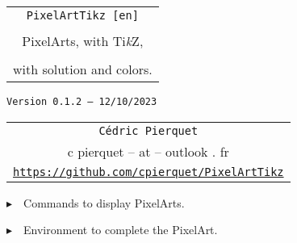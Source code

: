 \documentclass{article}
\def\TPversion{0.1.2}
\def\TPdate{12/10/2023}
\begin{document}
\pagestyle{fancy}

\thispagestyle{empty}

\vspace{2cm}

\begin{center}
	\begin{minipage}{0.75\linewidth}
	\begin{tcolorbox}[colframe=yellow,colback=yellow!15]
		\begin{center}
			\begin{tabular}{c}
				{\Huge \texttt{PixelArtTikz [en]}}\\
				\\
				{\LARGE PixelArts, with Ti\textit{k}Z}, \\
				\\
				{\LARGE with solution and colors.} \\
			\end{tabular}
			
			\medskip
			
			{\small \texttt{Version \TPversion{} -- \TPdate}}
		\end{center}
	\end{tcolorbox}
\end{minipage}
\end{center}

\vspace{0.5cm}

\begin{center}
	\begin{tabular}{c}
	\texttt{Cédric Pierquet}\\
	{\ttfamily c pierquet -- at -- outlook . fr}\\
	\texttt{\url{https://github.com/cpierquet/PixelArtTikz}}
\end{tabular}
\end{center}

\vspace{0.25cm}

{$\blacktriangleright$~~Commands to display PixelArts.}

\smallskip

{$\blacktriangleright$~~Environment to complete the PixelArt.}

\smallskip

\vspace{1cm}
\end{document}
